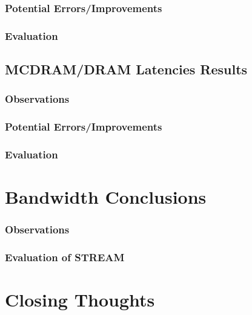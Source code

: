 \documentclass[bsc,frontabs,twoside,singlespacing,parskip,deptreport]{infthesis}     %
\begin{document}
\subsubsection{Potential Errors/Improvements}
\subsubsection{Evaluation}
\subsection{MCDRAM/DRAM Latencies Results}
\subsubsection{Observations}
\subsubsection{Potential Errors/Improvements}
\subsubsection{Evaluation}
\section{Bandwidth Conclusions}
\subsubsection{Observations}
\subsubsection{Evaluation of STREAM}
\section{Closing Thoughts}




\end{document}
